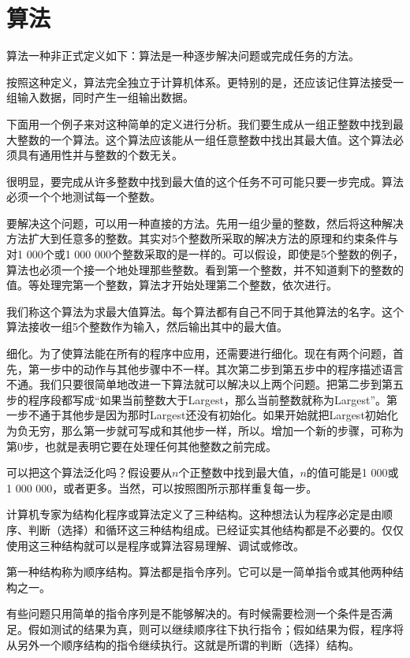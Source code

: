 \chapter{算法}
算法一种非正式定义如下：算法是一种逐步解决问题或完成任务的方法。

按照这种定义，算法完全独立于计算机体系。更特别的是，还应该记住算法接受一组输入数据，同时产生一组输出数据。

下面用一个例子来对这种简单的定义进行分析。我们要生成从一组正整数中找到最大整数的一个算法。这个算法应该能从一组任意整数中找出其最大值。这个算法必须具有通用性并与整数的个数无关。

很明显，要完成从许多整数中找到最大值的这个任务不可可能只要一步完成。算法必须一个个地测试每一个整数。

要解决这个问题，可以用一种直接的方法。先用一组少量的整数，然后将这种解决方法扩大到任意多的整数。其实对5个整数所采取的解决方法的原理和约束条件与对1 000个或1 000 000个整数采取的是一样的。可以假设，即使是5个整数的例子，算法也必须一个接一个地处理那些整数。看到第一个整数，并不知道剩下的整数的值。等处理完第一个整数，算法才开始处理第二个整数，依次进行。

我们称这个算法为求最大值算法。每个算法都有自己不同于其他算法的名字。这个算法接收一组5个整数作为输入，然后输出其中的最大值。

细化。为了使算法能在所有的程序中应用，还需要进行细化。现在有两个问题，首先，第一步中的动作与其他步骤中不一样。其次第二步到第五步中的程序描述语言不通。我们只要很简单地改进一下算法就可以解决以上两个问题。把第二步到第五步的程序段都写成“如果当前整数大于Largest，那么当前整数就称为Largest”。第一步不通于其他步是因为那时Largest还没有初始化。如果开始就把Largest初始化为负无穷，那么第一步就可写成和其他步一样，所以。增加一个新的步骤，可称为第0步，也就是表明它要在处理任何其他整数之前完成。

可以把这个算法泛化吗？假设要从$n$个正整数中找到最大值，$n$的值可能是1 000或1 000 000，或者更多。当然，可以按照图所示那样重复每一步。

计算机专家为结构化程序或算法定义了三种结构。这种想法认为程序必定是由顺序、判断（选择）和循环这三种结构组成。已经证实其他结构都是不必要的。仅仅使用这三种结构就可以是程序或算法容易理解、调试或修改。

第一种结构称为顺序结构。算法都是指令序列。它可以是一简单指令或其他两种结构之一。

有些问题只用简单的指令序列是不能够解决的。有时候需要检测一个条件是否满足。假如测试的结果为真，则可以继续顺序往下执行指令；假如结果为假，程序将从另外一个顺序结构的指令继续执行。这就是所谓的判断（选择）结构。

